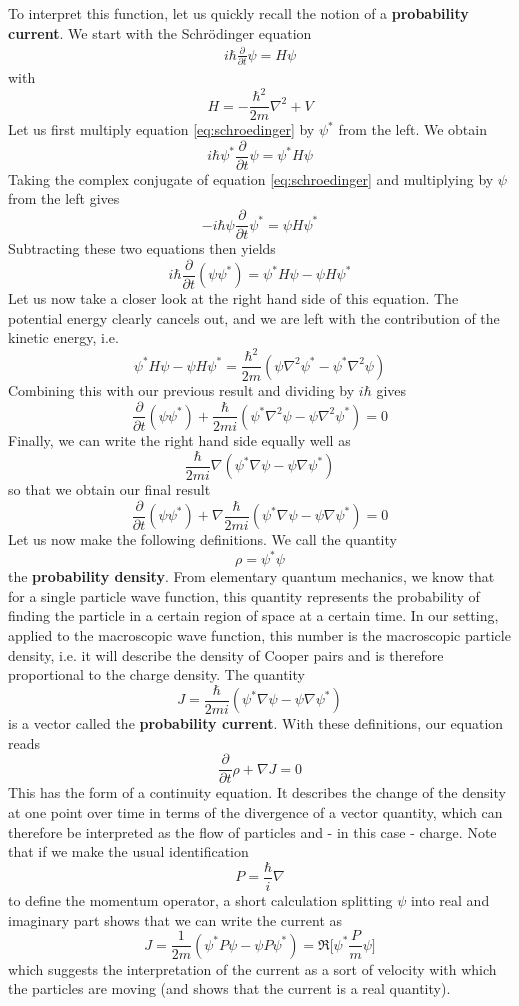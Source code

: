 \documentclass[a4paper, draft]{article}
\theoremstyle{own}
\theoremstyle{remark}
\begin{document}
To interpret this function, let us quickly recall the notion of a {\bf probability current}. We start with the Schr\"odinger equation
\begin{align}\label{eq:schroedinger}
i \hbar \frac{\partial}{\partial t} \psi = H \psi
\end{align}
with
$$
H = - \frac{\hbar^2}{2m} \nabla^2 + V
$$
Let us first multiply equation \eqref{eq:schroedinger} by $\psi^*$ from the left. We obtain
$$
i \hbar \psi^*\frac{\partial}{\partial t} \psi = \psi^* H \psi
$$
Taking the complex conjugate of equation \eqref{eq:schroedinger} and multiplying by $\psi$ from the left gives
$$
-i \hbar \psi\frac{\partial}{\partial t} \psi^* = \psi H \psi^*
$$
Subtracting these two equations then yields
$$
i \hbar \frac{\partial}{\partial t} (\psi \psi^*) = \psi^* H \psi - \psi H \psi^* 
$$
Let us now take a closer look at the right hand side of this equation. The potential energy clearly cancels out, and we are left with the contribution of the kinetic energy, i.e.
$$
\psi^* H \psi - \psi H \psi^*  = \frac{\hbar^2}{2m} (\psi \nabla^2 \psi^* - \psi^* \nabla^2 \psi)
$$
Combining this with our previous result and dividing by $i \hbar$ gives
$$
\frac{\partial}{\partial t} (\psi \psi^*) +
\frac{\hbar}{2mi} (\psi^* \nabla^2 \psi - \psi \nabla^2 \psi^*) = 0
$$
Finally, we can write the right hand side equally well as
$$
\frac{\hbar}{2mi} \nabla (\psi^* \nabla \psi - \psi \nabla \psi^*)
$$
so that we obtain our final result
$$
\frac{\partial}{\partial t} (\psi \psi^*) + \nabla 
\frac{\hbar}{2mi} (\psi^* \nabla \psi - \psi \nabla \psi^*) = 0
$$
Let us now make the following definitions. We call the quantity
$$
\rho = \psi^* \psi
$$
the {\bf probability density}. From elementary quantum mechanics, we know that for a single particle wave function, this quantity represents the probability of finding the particle in a certain region of space at a certain time. In our setting, applied to the macroscopic wave function, this number is the macroscopic particle density, i.e. it will describe the density of Cooper pairs and is therefore proportional to the charge density. The quantity
$$
J = \frac{\hbar}{2mi} (\psi^* \nabla \psi - \psi \nabla \psi^*)
$$
is a vector called the {\bf probability current}. With these definitions, our equation reads
$$
\frac{\partial}{\partial t} \rho + \nabla J =0
$$
This has the form of a continuity equation. It describes the change of the density at one point over time in terms of the divergence of a vector quantity, which can therefore be interpreted as the flow of particles and - in this case - charge.  Note that if we make the usual identification
$$
P = \frac{\hbar}{i} \nabla
$$
to define the momentum operator, a short calculation splitting $\psi$ into real and imaginary part shows that we can write the current as
$$
J = \frac{1}{2m} (\psi^* P \psi - \psi P \psi^*) = \Re \big[ 
\psi^* \frac{P}{m}  \psi \big]
$$
which suggests the interpretation of the current as a sort of velocity with which the particles are moving (and shows that the current is a real quantity).
\end{document}
